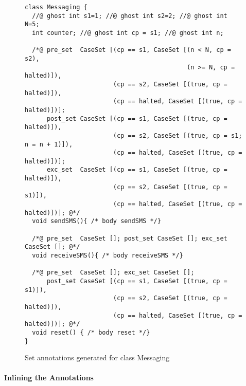 \begin{figure}[t]
{\small\begin{verbatim}
class Messaging {
  //@ ghost int s1=1; //@ ghost int s2=2; //@ ghost int N=5;
  int counter; //@ ghost int cp = s1; //@ ghost int n;

  /*@ pre_set  CaseSet [(cp == s1, CaseSet [(n < N, cp = s2),
                                            (n >= N, cp = halted)]),
                        (cp == s2, CaseSet [(true, cp = halted)]),
                        (cp == halted, CaseSet [(true, cp = halted)])];
      post_set CaseSet [(cp == s1, CaseSet [(true, cp = halted)]),
                        (cp == s2, CaseSet [(true, cp = s1; n = n + 1)]),
                        (cp == halted, CaseSet [(true, cp = halted)])];
      exc_set  CaseSet [(cp == s1, CaseSet [(true, cp = halted)]),
                        (cp == s2, CaseSet [(true, cp = s1)]),
                        (cp == halted, CaseSet [(true, cp = halted)])]; @*/
  void sendSMS(){ /* body sendSMS */}

  /*@ pre_set  CaseSet []; post_set CaseSet []; exc_set  CaseSet []; @*/
  void receiveSMS(){ /* body receiveSMS */}

  /*@ pre_set  CaseSet []; exc_set CaseSet [];
      post_set CaseSet [(cp == s1, CaseSet [(true, cp = s1)]),
                        (cp == s2, CaseSet [(true, cp = halted)]),
                        (cp == halted, CaseSet [(true, cp = halted)])]; @*/
  void reset() { /* body reset */}
}
\end{verbatim}}
\caption{Set annotations generated for class Messaging}\label{FigExampleStep2}
\end{figure}



\paragraph{Inlining the Annotations}

